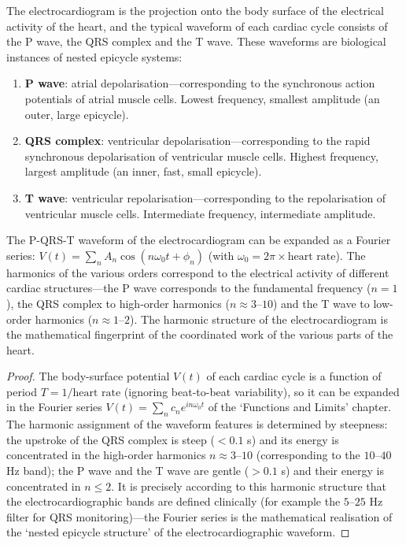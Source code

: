 \begin{proposition}\label{prop:ecg_periodic}
The electrocardiogram is the projection onto the body surface of the electrical activity of the heart, and the typical waveform of each cardiac cycle consists of the P wave, the QRS complex and the T wave. These waveforms are biological instances of nested epicycle systems:
\begin{enumerate}[label=(\roman*)]
    \item \textbf{P wave}: atrial depolarisation---corresponding to the synchronous action potentials of atrial muscle cells. Lowest frequency, smallest amplitude (an outer, large epicycle).
    \item \textbf{QRS complex}: ventricular depolarisation---corresponding to the rapid synchronous depolarisation of ventricular muscle cells. Highest frequency, largest amplitude (an inner, fast, small epicycle).
    \item \textbf{T wave}: ventricular repolarisation---corresponding to the repolarisation of ventricular muscle cells. Intermediate frequency, intermediate amplitude.
\end{enumerate}
The P-QRS-T waveform of the electrocardiogram can be expanded as a Fourier series: $V(t) = \sum_{n} A_n \cos(n\omega_0 t + \phi_n)$ (with $\omega_0 = 2\pi \times \text{heart rate}$). The harmonics of the various orders correspond to the electrical activity of different cardiac structures---the P wave corresponds to the fundamental frequency ($n=1$), the QRS complex to high-order harmonics ($n \approx 3$--$10$) and the T wave to low-order harmonics ($n \approx 1$--$2$). The harmonic structure of the electrocardiogram is the mathematical fingerprint of the coordinated work of the various parts of the heart.
\end{proposition}

\begin{proof}
The body-surface potential $V(t)$ of each cardiac cycle is a function of period $T = 1/\text{heart rate}$ (ignoring beat-to-beat variability), so it can be expanded in the Fourier series $V(t) = \sum_n c_n e^{in\omega_0 t}$ of the `Functions and Limits' chapter. The harmonic assignment of the waveform features is determined by steepness: the upstroke of the QRS complex is steep ($<0.1$ s) and its energy is concentrated in the high-order harmonics $n \approx 3$--$10$ (corresponding to the $10$--$40$ Hz band); the P wave and the T wave are gentle ($>0.1$ s) and their energy is concentrated in $n \le 2$. It is precisely according to this harmonic structure that the electrocardiographic bands are defined clinically (for example the $5$--$25$ Hz filter for QRS monitoring)---the Fourier series is the mathematical realisation of the `nested epicycle structure' of the electrocardiographic waveform.
\end{proof}

